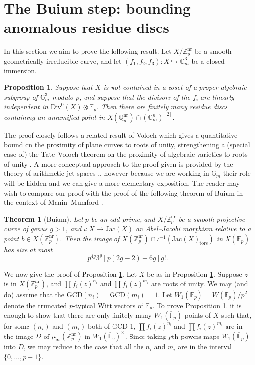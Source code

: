 \documentclass{amsart}
\def\Z{\mathbb Z}
\def\Q{\mathbb Q}
\newcommand{\Div}{\mathrm{Div}}
\newtheorem{theorem}{Theorem}
\newtheorem{proposition}{Proposition}
\theoremstyle{definition}
\newcommand{\nr}{\mathrm{nr}}
\newcommand{\F}{\mathbb{F}}
\newcommand{\tors}{\mathrm{tors}}
\newcommand{\Jac}{\mathrm{Jac}}
\begin{document}
\section{The Buium step: bounding anomalous residue discs}
In this section we aim to prove the following result. Let $X/\Z_p ^{\mathrm{nr}}$ be a smooth geometrically irreducible curve, and let $(f_1 ,f_2 ,f_3 ):X\hookrightarrow \mathbb{G}_m ^3 $ be a closed immersion.
\begin{proposition}\label{prop:voloch}
Suppose that $X$ is not contained in a coset of a proper algebraic subgroup of $\mathbb{G}_m ^3 $ modulo $p$, and suppose that the divisors of the $f_i$ are linearly independent in $\Div ^0 (X)\otimes \F _p $. Then there are finitely many residue discs containing an unramified point in $X(\Q _p ^{\mathrm{nr}})\cap (\mathbb{G}_m ^n )^{[2]}$.
\end{proposition}
The proof closely follows a related result of Voloch \cite{voloch} which gives a quantitative bound on the proximity of plane curves to roots of unity, strengthening a (special case of) the Tate--Voloch theorem on the proximity of algebraic varieties to roots of unity \cite{TV}. A more conceptual approach to the proof given is provided by the theory of arithmetic jet spaces \cite{BPS},\cite{buium:96}, however because we are working in $\mathbb{G}_m $ their role will be hidden and we can give a more elementary exposition. The reader may wish to compare our proof with the proof of the following theorem of Buium in the context of Manin--Mumford \cite{buium:96}.
\begin{theorem}[Buium]\label{thm:BMM}
Let $p$ be an odd prime, and $X/\Z _p ^{\mathrm{nr}}$ be a smooth projective curve of genus $g>1$, and $\iota :X\to \Jac (X)$ an Abel--Jacobi morphism relative to a point $b\in X(\Z _p ^{\mathrm{nr}})$. Then the image of $X(\Z _p ^{\mathrm{nr}})\cap \iota ^{-1}(\Jac (X)_{\tors})$ in $X(\overline{\F }_p )$ has size at most 
\[
p^{4g}3^g [p(2g-2)+6g]g!.
\]
\end{theorem}

We now give the proof of Proposition \ref{prop:voloch}. Let $X$ be as in Proposition \ref{prop:voloch}. Suppose $z$ is in $X(\Z_p ^{\nr })$, and $\prod f_i (z)^{n_i }$ and $\prod f_i (z)^{m_i }$ are roots of unity. We may (and do) assume that the GCD$(n_i ) =$GCD$(m_i )=1$. Let $W_1 (\overline{\F }_p )=W(\overline{\F }_p )/p^2 $ denote the truncated $p$-typical Witt vectors of $\overline{\F }_p $. To prove Proposition \ref{prop:voloch}, it is enough to show that there are only finitely many $W_1 (\overline{\F }_p )$ points of $X$ such that, for some $(n_i )$ and $(m_i )$ both of GCD 1, $\prod f_i (z)^{n_i }$  and $\prod f_i (z)^{m_i }$ are in the image $D$ of $\mu _{\infty }(\Z _p ^{\mathrm{nr}})$ in $W_1 (\overline{\F }_p )^\times $. Since taking $p$th powers maps $W_1 (\overline{\F }_p )$ into $D$, we may reduce to the case that all the $n_i$ and $m_i $ are in the interval $\{ 0,\ldots ,p-1 \}$.
\end{document}
